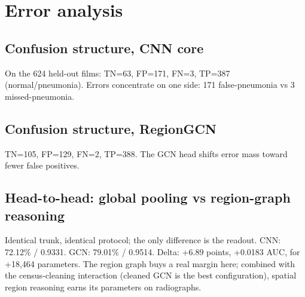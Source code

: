 
\section{Error analysis}
\subsection{Confusion structure, CNN core}
On the 624 held-out films:
TN=63, FP=171, FN=3, TP=387 (normal/pneumonia).
Errors concentrate on one side:
171 false-pneumonia vs 3 missed-pneumonia.
\subsection{Confusion structure, RegionGCN}
TN=105, FP=129, FN=2, TP=388.
The GCN head shifts error mass toward fewer false positives.
\subsection{Head-to-head: global pooling vs region-graph reasoning}
Identical trunk, identical protocol; the only difference is the readout.
CNN: 72.12\% / 0.9331.
GCN: 79.01\% / 0.9514.
Delta: +6.89 points,
+0.0183 AUC, for
+18{,}464 parameters. The region graph buys a real margin here; combined with the census-cleaning interaction (cleaned GCN is the best configuration), spatial region reasoning earns its parameters on radiographs.
